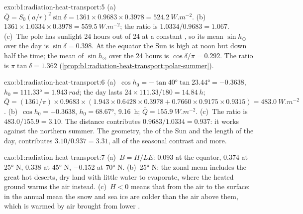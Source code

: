 \begin{solution}{exo:b1:radiation-heat-transport:5}
(a)~$\bar Q = S_0(a/r)^2\sin\delta = 1361 \times 0.9683 \times 0.3978 =
\qty{524.2}{W.m^{-2}}$. (b)~$1361 \times 1.0334 \times 0.3978 =
\qty{559.5}{W.m^{-2}}$; the ratio is $1.0334/0.9683 = 1.067$. (c)~The pole has
sunlight 24 hours out of 24 at a constant , so its mean $\sin h_\odot$ over
the day is $\sin\delta = 0.398$. At the equator the Sun is high at noon but down
half the time; the mean of $\sin h_\odot$ over the 24 hours is $\cos\delta/\pi =
0.292$. The ratio is $\pi\tan\delta = 1.362$
(\cref{prop:b1:radiation-heat-transport:polar-summer}).
\end{solution}

\begin{solution}{exo:b1:radiation-heat-transport:6}
(a)~$\cos h_0 = -\tan\ang{40}\tan\ang{23.44} = -0.3638$, $h_0 = \ang{111.33} =
\qty{1.943}{rad}$; the day lasts $24 \times 111.33/180 = \qty{14.84}{h}$; $\bar Q =
(1361/\pi) \times 0.9683 \times (1.943 \times 0.6428 \times 0.3978 + 0.7660 \times
0.9175 \times 0.9315) = \qty{483.0}{W.m^{-2}}$. (b)~$\cos h_0 = +0.3638$, $h_0 =
\ang{68.67}$, \qty{9.16}{h}; $\bar Q = \qty{155.9}{W.m^{-2}}$. (c)~The ratio is
$483.0/155.9 = 3.10$. The distance contributes $0.9683/1.0334 = 0.937$: it works
against the northern summer. The geometry, the  of the Sun and the length
of the day, contributes $3.10/0.937 = 3.31$, all of the seasonal contrast and more.
\end{solution}

\begin{solution}{exo:b1:radiation-heat-transport:7}
(a)~$B = H/LE$: \num{0.093} at the equator, \num{0.374} at \ang{25} N,
\num{0.338} at \ang{45} N, \num{-0.152} at \ang{70} N. (b)~\ang{25} N: the zonal
mean includes the great hot deserts, dry land with little water to evaporate, where
the heated ground warms the air instead. (c)~$H < 0$ means that  from the
air to the surface: in the annual mean the snow and sea ice are colder than the air
above them, which is warmed by air brought from lower .
\end{solution}


